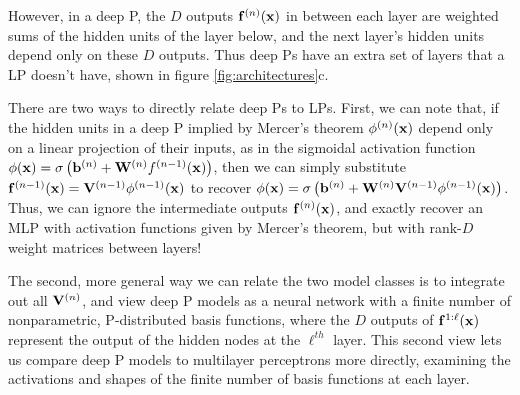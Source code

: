\documentclass[twoside]{article}
\makeatletter
\newlength{\nonHumbleHeight}
\def\@humbleformat#1{{\settoheight{\nonHumbleHeight}{#1}\resizebox{!}{0.94\nonHumbleHeight}{#1}}}%
\def\humble#1{\@humbleformat{#1}}%
\newcommand{\gp}{{\humble GP}}
\newcommand{\MLP}{{\humble MLP}}
\makeatother
\begin{document}
However, in a deep \gp{}, the $D$ outputs ${\bf{f}}^{(n)}({\bf{x}})$ in between each layer are weighted sums of the hidden units of the layer below, and the next layer's hidden units depend only on these $D$ outputs.  Thus deep \gp{}s have an extra set of layers that a \MLP{} doesn't have, shown in figure \ref{fig:architectures}c.

There are two ways to directly relate deep \gp{}s to \MLP{}s.  First, we can note that, if the hidden units in a deep \gp{} implied by Mercer's theorem $\phi^{(n)}({\bf{x}})$ depend only on a linear projection of their inputs, as in the sigmoidal activation function $\phi({\bf{x}}) = \sigma \left( {\bf{b}}^{(n)} + \mathbf{W}^{(n)}f^{(n-1)}({\bf{x}}) \right)$, then we can simply substitute ${\bf{f}}^{(n-1)}({\bf{x}}) = \mathbf{V}^{(n-1)} \phi^{(n-1)}({\bf{x}})$ to recover $\phi({\bf{x}}) = \sigma \left( {\bf{b}}^{(n)} + \mathbf{W}^{(n)} \mathbf{V}^{(n-1)} \phi^{(n-1)}({\bf{x}}) \right)$.  Thus, we can ignore the intermediate outputs ${\bf{f}}^{(n)}({\bf{x}})$, and exactly recover an MLP with activation functions given by Mercer's theorem, but with rank-$D$ weight matrices 
 between layers!

The second, more general way we can relate the two model classes is to integrate out all $\mathbf{V}^{(n)}$, and view deep \gp{} models as a neural network with a finite number of nonparametric, \gp{}-distributed basis functions, where the $D$ outputs of ${\bf{f}}^{1:\ell}({\bf{x}})$ represent the output of the hidden nodes at the $\ell^{th}$ layer.
%
This second view lets us compare deep \gp{} models to multilayer perceptrons more directly, examining the activations and shapes of the finite number of basis functions at each layer.

%
%

\end{document}
